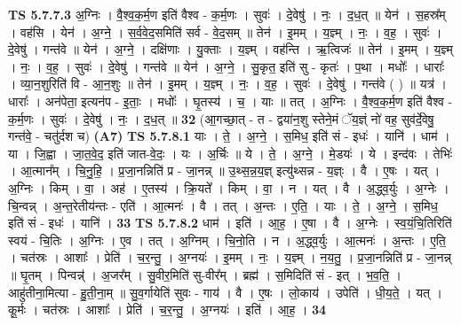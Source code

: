 \documentclass[17pt]{extarticle}
\begin{document}
                  \newline
                                \textbf{ TS 5.7.7.3} \newline
                  अ॒ग्निः । वै॒श्व॒क॒र्म॒ण इति॑ वैश्व - क॒र्म॒णः । सुवः॑ । दे॒वेषु॑ । नः॒ । द॒ध॒त् ॥ येन॑ । स॒हस्र᳚म् । वह॑सि । येन॑ । अ॒ग्ने॒ । स॒र्व॒वे॒द॒समिति॑ सर्व - वे॒द॒सम् ॥ तेन॑ । इ॒मम् । य॒ज्ञ्म् । नः॒ । व॒ह॒ । सुवः॑ । दे॒वेषु॑ । गन्त॑वे ॥ येन॑ । अ॒ग्ने॒ । दक्षि॑णाः । यु॒क्ताः । य॒ज्ञ्म् । वह॑न्ति । ऋ॒त्विजः॑ ॥ तेन॑ । इ॒मम् । य॒ज्ञ्म् । नः॒ । व॒ह॒ । सुवः॑ । दे॒वेषु॑ । गन्त॑वे ॥ येन॑ । अ॒ग्ने॒ । सु॒कृत॒ इति॑ सु - कृतः॑ । प॒था । मधोः᳚ । धाराः᳚ । व्या॒न॒शुरिति॑ वि - आ॒न॒शुः ॥ तेन॑ । इ॒मम् । य॒ज्ञ्म् । नः॒ । व॒ह॒ । सुवः॑ । दे॒वेषु॑ । गन्त॑वे ( ) ॥ यत्र॑ । धाराः᳚ । अन॑पेता॒ इत्यन॑प - इ॒ताः॒ । मधोः᳚ । घृ॒तस्य॑ । च॒ । याः ॥ तत् । अ॒ग्निः । वै॒श्व॒क॒र्म॒ण इति॑ वैश्व - क॒र्म॒णः । सुवः॑ । दे॒वेषु॑ । नः॒ । द॒ध॒त् ॥ \textbf{  32} \newline
                  \newline
                      (आ॒गच्छा॒त् - त - द्वया॑न॒शु स्तेने॒मं ॅय॒ज्ञ्ं नो॑ वह॒ सुव॑र्दे॒वेषु॒ गन्त॑वे॒ - चतु॑र्दश च)  \textbf{(A7)} \newline \newline
                                \textbf{ TS 5.7.8.1} \newline
                  याः । ते॒ । अ॒ग्ने॒ । स॒मिध॒ इति॑ सं - इधः॑ । यानि॑ । धाम॑ । या । जि॒ह्वा । जा॒त॒वे॒द॒ इति॑ जात-वे॒दः॒ । यः । अ॒र्चिः ॥ ये । ते॒ । अ॒ग्ने॒ । मे॒डयः॑ । ये । इन्द॑वः । तेभिः॑ । आ॒त्मान᳚म् । चि॒नु॒हि॒ । प्र॒जा॒नन्निति॑ प्र - जा॒नन्न् ॥ उ॒थ्स॒न्न॒य॒ज्ञ् इत्यु॑थ्सन्न - य॒ज्ञ्ः । वै । ए॒षः । यत् । अ॒ग्निः । किम् । वा॒ । अह॑ । ए॒तस्य॑ । क्रि॒यते᳚ । किम् । वा॒ । न । यत् । वै । अ॒द्ध्व॒र्युः । अ॒ग्नेः । चि॒न्वन्न् । अ॒न्त॒रेतीय॑न्तः - एति॑ । आ॒त्मनः॑ । वै । तत् । अ॒न्तः । ए॒ति॒ । याः । ते॒ । अ॒ग्ने॒ । स॒मिध॒ इति॑ सं - इधः॑ । यानि॑ । \textbf{  33} \newline
                  \newline
                                \textbf{ TS 5.7.8.2} \newline
                  धाम॑ । इति॑ । आ॒ह॒ । ए॒षा । वै । अ॒ग्नेः । स्व॒यं॒चि॒तिरिति॑ स्वयं - चि॒तिः । अ॒ग्निः । ए॒व । तत् । अ॒ग्निम् । चि॒नो॒ति । न । अ॒द्ध्व॒र्युः । आ॒त्मनः॑ । अ॒न्तः । ए॒ति॒ । चत॑स्रः । आशाः᳚ । प्रेति॑ । च॒र॒न्तु॒ । अ॒ग्नयः॑ । इ॒मम् । नः॒ । य॒ज्ञ्म् । न॒य॒तु॒ । प्र॒जा॒नन्निति॑ प्र - जा॒नन्न् ॥ घृ॒तम् । पिन्वन्न्॑ । अ॒जर᳚म् । सु॒वीर॒मिति॑ सु-वीर᳚म् । ब्रह्म॑ । स॒मिदिति॑ सं - इत् । भ॒व॒ति॒ । आहु॑तीना॒मित्या - हु॒ती॒ना॒म् ॥ सु॒व॒र्गायेति॑ सुवः - गाय॑ । वै । ए॒षः । लो॒काय॑ । उपेति॑ । धी॒य॒ते॒ । यत् । कू॒र्मः । चत॑स्रः । आशाः᳚ । प्रेति॑ । च॒र॒न्तु॒ । अ॒ग्नयः॑ । इति॑ । आ॒ह॒ । \textbf{  34} \newline
\end{document}
